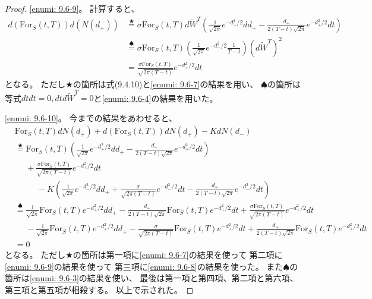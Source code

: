 \documentclass[uplatex]{jsarticle}
\theoremstyle{definition}
\begin{document}
\begin{proof}
  \ref{enumi: 9.6-9}。
  計算すると、
  \begin{align*}
    d\left( \mathrm{For}_S(t,T)\right) d\left( N(d_+) \right)
    &\overset{\bigstar}{=}
    \sigma \mathrm{For}_S(t,T)d\tilde{W}^T
    \left( \frac{1}{\sqrt{2\pi}}e^{-d_+^2/2}dd_+
    - \frac{d_+}{2(T-t)\sqrt{2\pi}}e^{-d_+^2/2}dt \right) \\
    &\overset{\spadesuit}{=}
    \sigma \mathrm{For}_S(t,T)
    \left( \frac{1}{\sqrt{2\pi}}e^{-d_+^2/2}\frac{1}{T-t} \right)
    \left( d\tilde{W}^T \right)^2\\
    &= \frac{\sigma \mathrm{For}_S(t,T)}
    {\sqrt{2\pi (T-t)}} e^{-d_+^2/2} dt
  \end{align*}
  となる。
  ただし\(\bigstar\)の箇所は式(9.4.10)と\ref{enumi: 9.6-7}の結果を用い、
  \(\spadesuit\)の箇所は
  等式\(dtdt = 0, dtd\tilde{W}^T=0\)と\ref{enumi: 9.6-4}の結果を用いた。

  \ref{enumi: 9.6-10}。
  今までの結果をあわせると、
  \begin{align*}
    &\mathrm{For}_S(t,T)dN(d_+)
    + d\left( \mathrm{For}_S(t,T)\right)dN(d_+) - KdN(d_-) \\
    &\overset{\bigstar}{=}
    \mathrm{For}_S(t,T)\left( \frac{1}{\sqrt{2\pi}}e^{-d_+^2/2}dd_+
    - \frac{d_+}{2(T-t)\sqrt{2\pi}}e^{-d_+^2/2}dt \right) \\
    &\ \ \ \ \ \
    + \frac{\sigma \mathrm{For}_S(t,T)}
    {\sqrt{2\pi (T-t)}} e^{-d_+^2/2} dt \\
    &\ \ \ \ \ \ \ \ \ \ \ \
    - K\left( \frac{1}{\sqrt{2\pi}}e^{-d_-^2/2}dd_+
    + \frac{\sigma}{\sqrt{2\pi(T-t)}}e^{-d_-^2/2}dt
    - \frac{d_+}{2(T-t)\sqrt{2\pi}}e^{-d_-^2/2}dt \right) \\
    &\overset{\spadesuit}{=}
    \frac{1}{\sqrt{2\pi}}\mathrm{For}_S(t,T)e^{-d_+^2/2}dd_+
    - \frac{d_+}{2(T-t)\sqrt{2\pi}}\mathrm{For}_S(t,T)e^{-d_+^2/2}dt
    + \frac{\sigma \mathrm{For}_S(t,T)}
    {\sqrt{2\pi (T-t)}} e^{-d_+^2/2} dt \\
    &\ \ \ \ \ \
    - \frac{1}{\sqrt{2\pi}}\mathrm{For}_S(t,T)e^{-d_+^2/2}dd_+
    - \frac{\sigma}{\sqrt{2\pi(T-t)}}\mathrm{For}_S(t,T)e^{-d_+^2/2}dt
    + \frac{d_+}{2(T-t)\sqrt{2\pi}}\mathrm{For}_S(t,T)e^{-d_+^2/2}dt \\
    &= 0
  \end{align*}
  となる。
  ただし\(\bigstar\)の箇所は第一項に\ref{enumi: 9.6-7}の結果を使って
  第二項に\ref{enumi: 9.6-9}の結果を使って
  第三項に\ref{enumi: 9.6-8}の結果を使った。
  また\(\spadesuit\)の箇所は\ref{enumi: 9.6-3}の結果を使い、
  最後は第一項と第四項、第二項と第六項、第三項と第五項が相殺する。
  以上で示された。
\end{proof}
\end{document}
